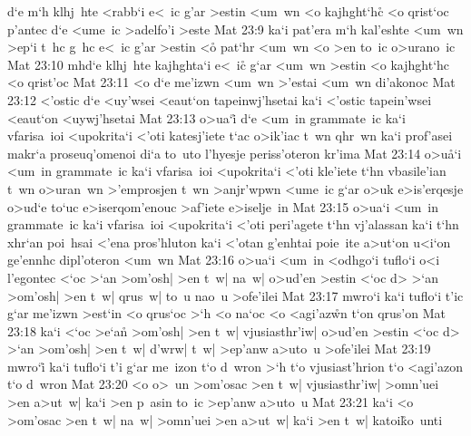 d`e
m`h
klhj~hte
<rabb`i
e<~ic
g'ar
>estin
<um~wn
<o
kajhght`hc\r{}
<o
qrist`oc
p'antec
d`e
<ume~ic
>adelfo'i
>este\bibvsend
\vs Mat 23:9
ka`i
pat'era
m`h
kal'eshte
<um~wn
>ep`i
t~hc
g~hc
e<~ic
g'ar
>estin
<o\r{}
pat`hr
<um~wn
<o
>en
to~ic
o>urano~ic\bibvsend
\vs Mat 23:10
mhd`e
klhj~hte
kajhghta`i
e<~ic\r{}
g`ar
<um~wn
>estin
<o
kajhght`hc
<o
qrist'oc\bibvsend
\vs Mat 23:11
<o
d`e
me'izwn
<um~wn
>'estai
<um~wn
di'akonoc\bibvsend
\vs Mat 23:12
<'ostic
d`e
<uy'wsei
<eaut`on
tapeinwj'hsetai
ka`i
<'ostic
tapein'wsei
<eaut`on
<uywj'hsetai\bibvsend
\vs Mat 23:13
o>ua`i\r{}
d`e
<um~in
grammate~ic
ka`i
vfarisa~ioi
<upokrita`i
<'oti
katesj'iete
t`ac
o>ik'iac
t~wn
qhr~wn
ka`i
prof'asei
makr`a
proseuq'omenoi
di`a
to~uto
l'hyesje
periss'oteron
kr'ima\bibvsend
\vs Mat 23:14
o>u\r{a}`i
<um~in
grammate~ic
ka`i
vfarisa~ioi
<upokrita`i
<'oti
kle'iete
t`hn
vbasile'ian
t~wn
o>uran~wn
>'emprosjen
t~wn
>anjr'wpwn
<ume~ic
g`ar
o>uk
e>is'erqesje
o>ud`e
to`uc
e>iserqom'enouc
>af'iete
e>iselje~in\bibvsend
\vs Mat 23:15
o>ua`i
<um~in
grammate~ic
ka`i
vfarisa~ioi
<upokrita`i
<'oti
peri'agete
t`hn
vj'alassan
ka`i
t`hn
xhr`an
poi~hsai
<'ena
pros'hluton
ka`i
<'otan
g'enhtai
poie~ite
a>ut`on
u<i`on
ge'ennhc
dipl'oteron
<um~wn\bibvsend
\vs Mat 23:16
o>ua`i
<um~in
<odhgo`i
tuflo`i
o<i
l'egontec
<`oc
>`an
>om'osh|
>en
t~w|
na~w|
o>ud'en
>estin
<`oc
d>
>`an
>om'osh|
>en
t~w|
qrus~w|
to~u
nao~u
>ofe'ilei\bibvsend
\vs Mat 23:17
mwro`i
ka`i
tuflo`i
t'ic
g`ar
me'izwn
>est`in
<o
qrus`oc
>`h
<o
na`oc
<o
<agi'az\r{w}n
t`on
qrus'on\bibvsend
\vs Mat 23:18
ka`i
<`oc
>e`a\r{n}
>om'osh|
>en
t~w|
vjusiasthr'iw|
o>ud'en
>estin
<`oc
d>
>`an
>om'osh|
>en
t~w|
d'wrw|
t~w|
>ep'anw
a>uto~u
>ofe'ilei\bibvsend
\vs Mat 23:19
mwro`i\r{}
ka`i
tuflo`i
t'i
g`ar
me~izon
t`o
d~wron
>`h
t`o
vjusiast'hrion
t`o
<agi'azon
t`o
d~wron\bibvsend
\vs Mat 23:20
<o
o>~un
>om'osac
>en
t~w|
vjusiasthr'iw|
>omn'uei
>en
a>ut~w|
ka`i
>en
p~asin
to~ic
>ep'anw
a>uto~u\bibvsend
\vs Mat 23:21
ka`i
<o
>om'osac
>en
t~w|
na~w|
>omn'uei
>en
a>ut~w|
ka`i
>en
t~w|
katoi\r{k}o~unti
